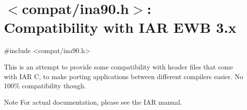 \hypertarget{group__compat__ina90}{}\section{$<$compat/ina90.h$>$\+: Compatibility with I\+AR E\+WB 3.x}
\label{group__compat__ina90}

\begin{DoxyCode}
\textcolor{preprocessor}{#include <compat/ina90.h>} 
\end{DoxyCode}


This is an attempt to provide some compatibility with header files that come with I\+AR C, to make porting applications between different compilers easier. No 100\% compatibility though.

\begin{DoxyNote}{Note}
For actual documentation, please see the I\+AR manual. 
\end{DoxyNote}
